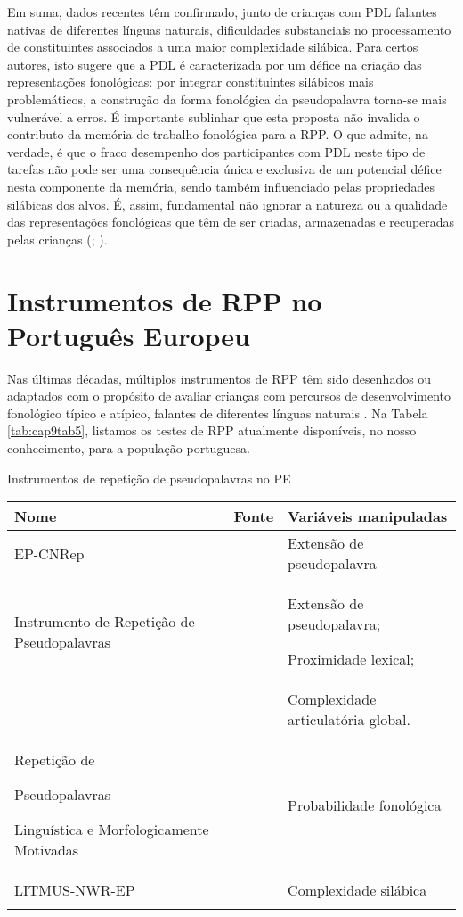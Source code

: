\documentclass[output=paper,colorlinks,citecolor=brown,booklanguage=portuguese]{langscibook}
\begin{document}
Em suma, dados recentes têm confirmado, junto de crianças com PDL falantes nativas de diferentes línguas naturais, dificuldades substanciais no processamento de constituintes associados a uma maior complexidade silábica. Para certos autores, isto sugere que a PDL é caracterizada por um défice na criação das representações fonológicas: por integrar constituintes silábicos mais problemáticos, a construção da forma fonológica da pseudopalavra torna-se mais vulnerável a erros. É importante sublinhar que esta proposta não invalida o contributo da memória de trabalho fonológica para a RPP. O que admite, na verdade, é que o fraco desempenho dos participantes com PDL neste tipo de tarefas não pode ser uma consequência única e exclusiva de um potencial défice nesta componente da memória, sendo também influenciado pelas propriedades silábicas dos alvos. É, assim, fundamental não ignorar a natureza ou a qualidade das representações fonológicas que têm de ser criadas, armazenadas e recuperadas pelas crianças (\citealp[53]{Marshall2009}; \citealp{Snowling1991}).

\section{Instrumentos de RPP no Português Europeu}
Nas últimas décadas, múltiplos instrumentos de RPP têm sido desenhados ou adaptados com o propósito de avaliar crianças com percursos de desenvolvimento fonológico típico e atípico, falantes de diferentes línguas naturais \citep{Coady2008}. Na Tabela \ref{tab:cap9tab5}, listamos os testes de RPP atualmente disponíveis, no nosso conhecimento, para a população portuguesa.



\begin{Tabela}
\caption{Instrumentos de repetição de pseudopalavras no PE}
\label{tab:cap9tab5}


\begin{tabularx}{\textwidth}{Q>{\raggedright}p{2.7cm}Q}
\lsptoprule
Nome&	Fonte&	Variáveis
{manipuladas} \\
\midrule
EP-CNRep & \citet{CruzSantos2009} & Extensão de {pseudopalavra}\\
\tablevspace
Instrumento de Repetição
de Pseudopalavras &
	\citet{Ribeiro2011} &	Extensão de pseudopalavra;

{Proximidade} lexical;\\
&&Complexidade articulatória global.\\
\tablevspace
Repetição de

{Pseudopalavras}

{Linguística} e
Morfologicamente
Motivadas &	\citet{Coutinho2014}&	Probabilidade fonológica\\
\tablevspace
LITMUS-NWR-EP &	\citet{Almeida2015} 

\citet{Catarino2019} &	Complexidade silábica\\
\lspbottomrule
\end{tabularx}
\end{Tabela}
\end{document}
